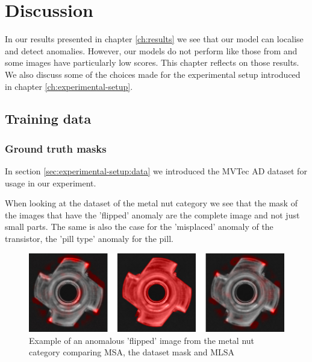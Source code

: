 \chapter{Discussion}\label{ch:discussion}

In our results presented in chapter \ref{ch:results} we see that our model can localise and detect anomalies. However, our models do not perform like those from \cite{pirnay_inpainting_2021} and some images have particularly low scores. This chapter reflects on those results. We also discuss some of the choices made for the experimental setup introduced in chapter \ref{ch:experimental-setup}.

\section{Training data}

\subsection{Ground truth masks}

In section \ref{sec:experimental-setup:data} we introduced the MVTec AD dataset for usage in our experiment.

When looking at the dataset of the metal nut category we see that the mask of the images that have the 'flipped' anomaly are the complete image and not just small parts. The same is also the case for the 'misplaced' anomaly of the transistor, the 'pill type' anomaly for the pill.

\begin{figure}[ht!]
\centering
\includegraphics[width=\textwidth]{imgs/samples/metal-nut_flip_anomap.jpg}
\caption{Example of an anomalous 'flipped' image from the metal nut category comparing MSA, the dataset mask and MLSA}
\label{fig:discussion:metal-nut-anomap}
\end{figure}

